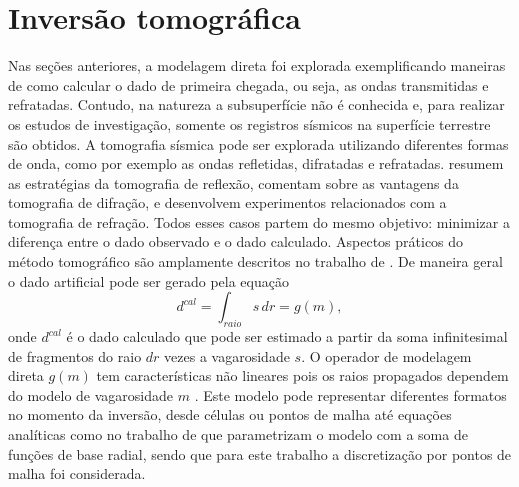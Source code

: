 \section{Inversão tomográfica}

Nas seções anteriores, a modelagem direta foi explorada exemplificando maneiras de como calcular o dado de primeira chegada, ou seja, as ondas transmitidas e refratadas. Contudo, na natureza a subsuperfície não é conhecida e, para realizar os estudos de investigação, somente os registros sísmicos na superfície terrestre são obtidos. A tomografia sísmica pode ser explorada utilizando diferentes formas de onda, como por exemplo as ondas refletidas, difratadas e refratadas.  resumem as estratégias da tomografia de reflexão,  comentam sobre as vantagens da tomografia de difração,  e  desenvolvem experimentos relacionados com a tomografia de refração. Todos esses casos partem do mesmo objetivo: minimizar a diferença entre o dado observado e o dado calculado.  Aspectos práticos do método tomográfico são amplamente descritos no trabalho de . De maneira geral o dado artificial pode ser gerado pela equação
\begin{equation}
	d^{cal} = \displaystyle\int_{raio} s\,dr = g(m),
\end{equation}
\noindent onde $d^{cal}$ é o dado calculado que pode ser estimado a partir da soma infinitesimal de fragmentos do raio $dr$ vezes a vagarosidade $s$. O operador de modelagem direta $g(m)$ tem características não lineares pois os raios propagados dependem do modelo de vagarosidade $m$ \cite{seo2012nonlinear}. Este modelo pode representar diferentes formatos no momento da inversão, desde células ou pontos de malha até equações analíticas como no trabalho de  que parametrizam o modelo com a soma de funções de base radial, sendo que para este trabalho a discretização por pontos de malha foi considerada. 

